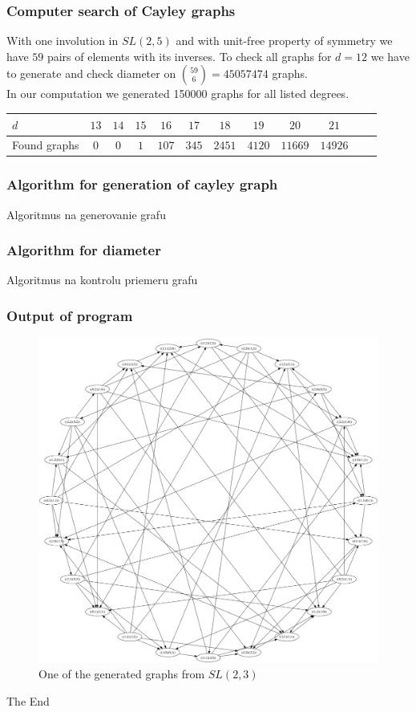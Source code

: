 \documentclass{beamer}
\begin{document}
\begin{frame}
	\frametitle{Computer search of Cayley graphs}
	With one involution in $SL(2,5)$ and with unit-free property of symmetry we have $59$ pairs of elements with its inverses. To check all graphs for $d=12$ we have to generate and check diameter on ${59 \choose 6} = 45057474$ graphs. \\
	In our computation we generated 150000 graphs for all listed degrees. \\
	\begin{tabular}[htbp]{l*{10}{c}r}
		$d$ & $13$ & $14$ & $15$ & $16$ & $17$ & $18$ & $19$ & $20$ & $21$ \\
		\hline
 		Found graphs & $0$  & $0$ & $1$ & $107$ & $345$ & $2451$  & $4120$ & $11669$ & $14926$ \\
	\end{tabular} 
\end{frame}
\begin{frame}
	\frametitle{Algorithm for generation of cayley graph}
	Algoritmus na generovanie grafu
\end{frame}
\begin{frame}
	\frametitle{Algorithm for diameter}
	Algoritmus na kontrolu priemeru grafu
\end{frame}
\begin{frame}
	\frametitle{Output of program}
	\begin{figure}[!ht]
 		\centering
 		\includegraphics[scale=0.12]{example.png}
		\caption{One of the generated graphs from $SL(2,3)$ }
	\end{figure}
\end{frame}
\begin{frame}
\Huge{\centerline{The End}}
\end{frame}
\end{document}
